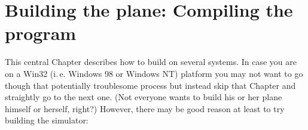 
\chapter{Building the plane: Compiling the program\label{building}}

This central Chapter describes how to build \FlightGear on several systems. In case you
are on a Win32 (i.\,e. Windows 98 or Windows NT) platform you may not want to go though
that potentially troublesome process but instead skip that Chapter and straightly go to
the next one. (Not everyone wants to build his or her plane himself or herself, right?)
However, there may be good reason at least to try building the simulator:

